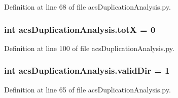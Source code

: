 Definition at line 68 of file acs\-Duplication\-Analysis.\-py.

\hypertarget{a00094_a272117a5453b492c5fe58c89b0454921}{
\subsubsection[{tot\-X}]{\setlength{\rightskip}{0pt plus 5cm}int acs\-Duplication\-Analysis.\-tot\-X = 0}}\label{a00094_a272117a5453b492c5fe58c89b0454921}


Definition at line 100 of file acs\-Duplication\-Analysis.\-py.

\hypertarget{a00094_a149535e505ef09d35a9ea8f4cee45b1f}{
\subsubsection[{valid\-Dir}]{\setlength{\rightskip}{0pt plus 5cm}int acs\-Duplication\-Analysis.\-valid\-Dir = 1}}\label{a00094_a149535e505ef09d35a9ea8f4cee45b1f}


Definition at line 65 of file acs\-Duplication\-Analysis.\-py.

